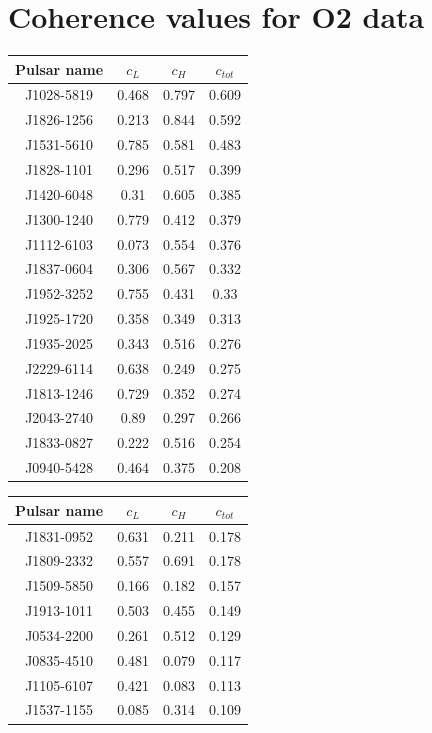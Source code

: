 \documentclass[11pt,a4paper,final]{iopart}
\begin{document}
\section{Coherence values for O2 data}
\begin{center}
\begin{table}[h!]
\begin{tabular}[t]{c|ccc}
\toprule
   \textbf{Pulsar name} & $c_L$ &  $c_H$  & $c_{tot}$ \\
\midrule 
J1028-5819 & 0.468 & 0.797 & 0.609 \\
J1826-1256 & 0.213 & 0.844 & 0.592 \\
J1531-5610 & 0.785 & 0.581 & 0.483 \\
J1828-1101 & 0.296 & 0.517 & 0.399 \\
J1420-6048 & 0.31  & 0.605 & 0.385 \\
J1300-1240 & 0.779 & 0.412 & 0.379 \\
J1112-6103 & 0.073 & 0.554 & 0.376 \\
J1837-0604 & 0.306 & 0.567 & 0.332 \\
J1952-3252 & 0.755 & 0.431 & 0.33  \\
J1925-1720 & 0.358 & 0.349 & 0.313 \\
J1935-2025 & 0.343 & 0.516 & 0.276 \\
J2229-6114 & 0.638 & 0.249 & 0.275 \\
J1813-1246 & 0.729 & 0.352 & 0.274 \\
J2043-2740 & 0.89  & 0.297 & 0.266 \\
J1833-0827 & 0.222 & 0.516 & 0.254 \\
J0940-5428 & 0.464 & 0.375 & 0.208 \\
\midrule
\end{tabular}
\hspace{0.5cm}
\begin{tabular}[t]{c|ccc}
\toprule
  \textbf{Pulsar name} & $c_L$ &  $c_H$  & $c_{tot}$\\
\midrule 
J1831-0952 & 0.631 & 0.211 & 0.178 \\
J1809-2332 & 0.557 & 0.691 & 0.178 \\
J1509-5850 & 0.166 & 0.182 & 0.157 \\
J1913-1011 & 0.503 & 0.455 & 0.149 \\
J0534-2200 & 0.261 & 0.512 & 0.129 \\
J0835-4510 & 0.481 & 0.079 & 0.117 \\
J1105-6107 & 0.421 & 0.083 & 0.113 \\
J1537-1155 & 0.085 & 0.314 & 0.109 \\

\end{tabular}
\end{table}
\end{center}
\end{document}
